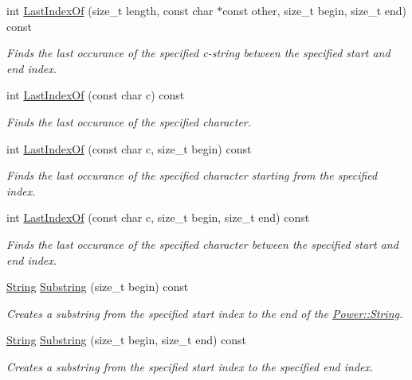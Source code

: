 \begin{DoxyCompactItemize}
int \hyperlink{class_power_1_1_string_abf58cac446f5479ae4436974bad5e4af}{Last\+Index\+Of} (size\+\_\+t length, const char $\ast$const other, size\+\_\+t begin, size\+\_\+t end) const
\begin{DoxyCompactList}\small\item\em Finds the last occurance of the specified c-\/string between the specified start and end index. \end{DoxyCompactList}\item 
int \hyperlink{class_power_1_1_string_a5d19cb2d35f6cd396c1910579b5ba89e}{Last\+Index\+Of} (const char c) const
\begin{DoxyCompactList}\small\item\em Finds the last occurance of the specified character. \end{DoxyCompactList}\item 
int \hyperlink{class_power_1_1_string_a0791550659fc2f5c9728eac06208d73c}{Last\+Index\+Of} (const char c, size\+\_\+t begin) const
\begin{DoxyCompactList}\small\item\em Finds the last occurance of the specified character starting from the specified index. \end{DoxyCompactList}\item 
int \hyperlink{class_power_1_1_string_a983604990be4acb0f22ab400b46445ea}{Last\+Index\+Of} (const char c, size\+\_\+t begin, size\+\_\+t end) const
\begin{DoxyCompactList}\small\item\em Finds the last occurance of the specified character between the specified start and end index. \end{DoxyCompactList}\item 
\hyperlink{class_power_1_1_string}{String} \hyperlink{class_power_1_1_string_a754d4d67de005b89aba041db5f551e1c}{Substring} (size\+\_\+t begin) const
\begin{DoxyCompactList}\small\item\em Creates a substring from the specified start index to the end of the \hyperlink{class_power_1_1_string}{Power\+::\+String}. \end{DoxyCompactList}\item 
\hyperlink{class_power_1_1_string}{String} \hyperlink{class_power_1_1_string_a648cd16b1af13b87a20d623d933f067c}{Substring} (size\+\_\+t begin, size\+\_\+t end) const
\begin{DoxyCompactList}\small\item\em Creates a substring from the specified start index to the specified end index. \end{DoxyCompactList}\item 

\end{DoxyCompactItemize}
